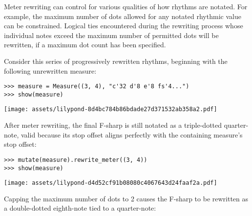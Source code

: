 Meter rewriting can control for various qualities of how rhythms are notated.
For example, the maximum number of dots allowed for any notated rhythmic value
can be constrained. Logical ties encountered during the rewriting process whose
individual notes exceed the maximum number of permitted dots will be rewritten,
if a maximum dot count has been specified.

Consider this series of progressively rewritten rhythms, beginning with the
following unrewritten  measure:

\begin{comment}
<abjad>
measure = Measure((3, 4), "c'32 d'8 e'8 fs'4...")
show(measure)
</abjad>
\end{comment}

\begin{abjadbookoutput}
\begin{singlespacing}
\vspace{-0.5\baselineskip}
\begin{verbatim}
>>> measure = Measure((3, 4), "c'32 d'8 e'8 fs'4...")
>>> show(measure)
\end{verbatim}
\noindent\texttt{[image: assets/lilypond-8d4bc784b86bdade27d371532ab358a2.pdf]}
\end{singlespacing}
\end{abjadbookoutput}

\noindent After meter rewriting, the final F-sharp is still notated as a
triple-dotted quarter-note, valid because its stop offset aligns perfectly with
the containing measure's stop offset:

\begin{comment}
<abjad>
mutate(measure).rewrite_meter((3, 4))
show(measure)
</abjad>
\end{comment}

\begin{abjadbookoutput}
\begin{singlespacing}
\vspace{-0.5\baselineskip}
\begin{verbatim}
>>> mutate(measure).rewrite_meter((3, 4))
>>> show(measure)
\end{verbatim}
\noindent\texttt{[image: assets/lilypond-d4d52cf91b08080c4067643d24faaf2a.pdf]}
\end{singlespacing}
\end{abjadbookoutput}

\noindent Capping the maximum number of dots to 2 causes the F-sharp to be
rewritten as a double-dotted eighth-note tied to a quarter-note:

